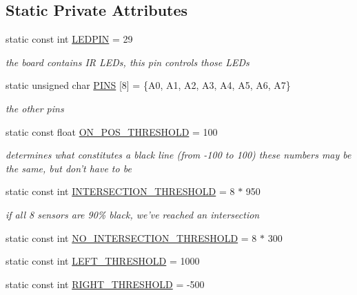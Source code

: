 \subsection*{Static Private Attributes}
\begin{DoxyCompactItemize}
\item 
static const int \hyperlink{classLineSensor_a09da44442cb9e026af2053b5d0b4f2ce}{L\-E\-D\-P\-I\-N} = 29
\begin{DoxyCompactList}\small\item\em the board contains I\-R L\-E\-Ds, this pin controls those L\-E\-Ds \end{DoxyCompactList}\item 
static unsigned char \hyperlink{classLineSensor_a4a017e267d06958d81523ac733e9835d}{P\-I\-N\-S} \mbox{[}8\mbox{]} = \{A0, A1, A2, A3, A4, A5, A6, A7\}
\begin{DoxyCompactList}\small\item\em the other pins \end{DoxyCompactList}\item 
static const float \hyperlink{classLineSensor_a3e3c5f134159562e56fcd06e55cc7024}{O\-N\-\_\-\-P\-O\-S\-\_\-\-T\-H\-R\-E\-S\-H\-O\-L\-D} = 100
\begin{DoxyCompactList}\small\item\em determines what constitutes a black line (from -\/100 to 100) these numbers may be the same, but don't have to be \end{DoxyCompactList}\item 
static const int \hyperlink{classLineSensor_a55b9f63bd4c01990f6f2d7baa830d2ec}{I\-N\-T\-E\-R\-S\-E\-C\-T\-I\-O\-N\-\_\-\-T\-H\-R\-E\-S\-H\-O\-L\-D} = 8 $\ast$ 950
\begin{DoxyCompactList}\small\item\em if all 8 sensors are 90\% black, we've reached an intersection \end{DoxyCompactList}\item 
static const int \hyperlink{classLineSensor_a76ae45af94dc228b239e7e9812955a6c}{N\-O\-\_\-\-I\-N\-T\-E\-R\-S\-E\-C\-T\-I\-O\-N\-\_\-\-T\-H\-R\-E\-S\-H\-O\-L\-D} = 8 $\ast$ 300
\item 
static const int \hyperlink{classLineSensor_a06d5f222428084879e9a0fc38d8b0b5e}{L\-E\-F\-T\-\_\-\-T\-H\-R\-E\-S\-H\-O\-L\-D} = 1000
\item 
static const int \hyperlink{classLineSensor_a8a78ded72775b1b248f9d9e60b352b49}{R\-I\-G\-H\-T\-\_\-\-T\-H\-R\-E\-S\-H\-O\-L\-D} = -\/500
\item 

\end{DoxyCompactItemize}
